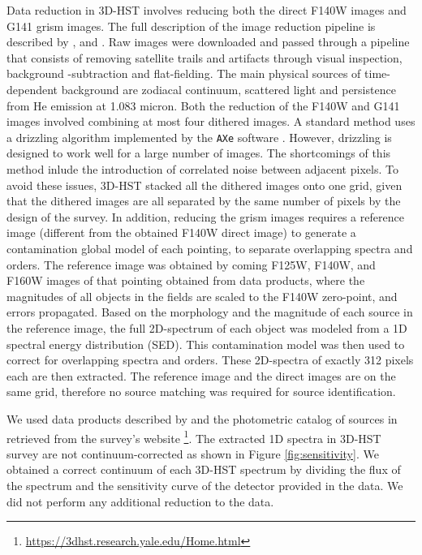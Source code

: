 \documentclass[manuscript]{aastex63}
\begin{document}
Data reduction in 3D-HST involves reducing both the direct F140W images and G141 grism images. The full description of the image reduction pipeline is described by \cite{Brammer2012}, \cite{Skelton2014}  and \cite{Momcheva2016}. Raw images were downloaded and passed through a pipeline that consists of removing satellite trails and artifacts through visual inspection, background -subtraction and flat-fielding. The main physical sources of time-dependent background are zodiacal continuum, scattered light and persistence from He emission at 1.083 micron. Both the reduction of the F140W and G141 images involved combining at most four dithered images. A standard method uses a drizzling algorithm implemented by the \texttt{AXe} software \citep{Kuntschner2013, Kummel2009}. However, drizzling is designed to work well for a large number of images. The shortcomings of this method inlude the introduction of correlated noise between adjacent pixels. To avoid these issues, 3D-HST stacked all the dithered images onto one grid, given that the dithered images are all separated by the same number of pixels by the design of the survey. In addition, reducing the grism images requires a reference image (different from the obtained F140W direct image) to generate a contamination global model of each pointing, to separate overlapping spectra and orders. The reference image was obtained by coming F125W, F140W, and F160W images of that pointing obtained from \cite{Skelton2014} data products, where the magnitudes of all objects in the fields are scaled to the F140W zero-point, and errors propagated. Based on the morphology and the magnitude of each source in the reference image, the full 2D-spectrum of each object was modeled from a 1D spectral energy distribution (SED). This contamination model was then used to correct for overlapping spectra and orders. These 2D-spectra of exactly 312 pixels each are then extracted. The reference image and the direct images are on the same grid, therefore no source matching was required for source identification.

We used data products described by \cite{Momcheva2016} and the photometric catalog of sources in \cite{Skelton2014} retrieved from the survey's website \footnote{\url{https://3dhst.research.yale.edu/Home.html}}. The extracted 1D spectra in 3D-HST survey are not continuum-corrected as shown in Figure \ref{fig:sensitivity}. We obtained a correct continuum of each 3D-HST spectrum by dividing the flux of the spectrum and the sensitivity curve of the detector provided in the data. We did not perform any additional reduction to the data.
\end{document}
